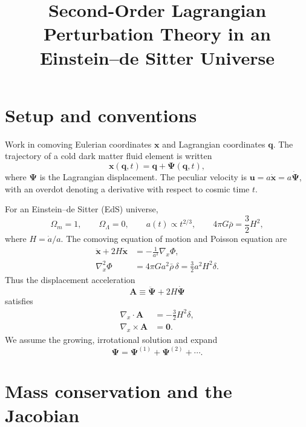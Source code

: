 \documentclass[11pt]{article}
\title{Second-Order Lagrangian Perturbation Theory in an Einstein--de Sitter Universe}
\author{}
\date{}
\newcommand{\gradx}{\nabla_{\!x}}
\newcommand{\lapx}{\nabla_{\!x}^{2}}
\newcommand{\PsiL}{\bm{\Psi}}
\newcommand{\xv}{\bm{x}}
\newcommand{\qv}{\bm{q}}
\begin{document}
\maketitle

\section{Setup and conventions}

Work in comoving Eulerian coordinates $\xv$ and Lagrangian coordinates
$\qv$.  The trajectory of a cold dark matter fluid element is written
\begin{equation}
  \xv(\qv,t)=\qv+\PsiL(\qv,t),
\end{equation}
where $\PsiL$ is the Lagrangian displacement.  The peculiar velocity is
$\bm{u}=a\dot{\xv}=a\dot{\PsiL}$, with an overdot denoting a derivative
with respect to cosmic time $t$.

For an Einstein--de Sitter (EdS) universe,
\begin{equation}
  \Omega_m=1,\qquad \Omega_\Lambda=0,\qquad
  a(t)\propto t^{2/3},\qquad
  4\pi G\bar\rho = \frac{3}{2}H^2 ,
\end{equation}
where $H=\dot a/a$.  The comoving equation of motion and Poisson equation are
\begin{align}
  \ddot{\xv}+2H\dot{\xv}
    &= -\frac{1}{a^2}\gradx\Phi,\\
  \lapx\Phi
    &= 4\pi G a^2\bar\rho\,\delta
     = \frac{3}{2}a^2H^2\delta .
\end{align}
Thus the displacement acceleration
\begin{equation}
  \bm{A}\equiv \ddot{\PsiL}+2H\dot{\PsiL}
\end{equation}
satisfies
\begin{align}
  \gradx\cdot \bm{A} &= -\frac{3}{2}H^2\delta, \label{eq:euler-div}\\
  \gradx\times \bm{A} &= \bm{0}. \label{eq:euler-curl}
\end{align}
We assume the growing, irrotational solution and expand
\begin{equation}
  \PsiL = \PsiL^{(1)}+\PsiL^{(2)}+\cdots .
\end{equation}

\section{Mass conservation and the Jacobian}
\end{document}
